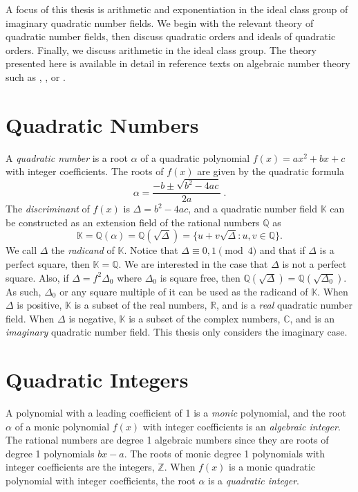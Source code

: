 \documentclass{ucalgthes1}
\theoremstyle{definition}
\newcommand{\CC}{\mathbb{C}}
\newcommand{\RR}{\mathbb{R}}
\newcommand{\KK}{\mathbb{K}}
\newcommand{\ZZ}{\mathbb{Z}}
\newcommand{\QQ}{\mathbb{Q}}
\begin{document}
A focus of this thesis is arithmetic and exponentiation in the ideal class group of imaginary quadratic number fields.  We begin with the relevant theory of quadratic number fields, then discuss quadratic orders and ideals of quadratic orders.  Finally, we discuss arithmetic in the ideal class group.  The theory presented here is available in detail in reference texts on algebraic number theory such as \cite{Cohn1980}, \cite{Hua2012}, or \cite{Ireland1990}. 



\section{Quadratic Numbers}

A \emph{quadratic number} is a root $\alpha$ of a quadratic polynomial $f(x) = ax^2 + bx + c$ with integer coefficients. The roots of $f(x)$ are given by the quadratic formula
\[
	\alpha = \frac{-b \pm \sqrt{b^2 - 4ac}}{2a} ~.
\]
The \emph{discriminant} of $f(x)$ is $\Delta = b^2 - 4ac$, and a quadratic number field $\KK$ can be constructed as an extension field of the rational numbers $\QQ$ as
\[
	\KK = \QQ(\alpha) = \QQ(\sqrt{\Delta}) = \{u + v\sqrt{\Delta} : u,v \in \QQ\}.
\]
We call $\Delta$ the \emph{radicand} of $\KK$.  Notice that $\Delta \equiv 0, 1 \pmod 4$ and that if $\Delta$ is a perfect square, then $\KK = \QQ$.  We are interested in the case that $\Delta$ is not a perfect square.  Also, if $\Delta = f^2\Delta_0$ where $\Delta_0$ is square free, then $\QQ(\sqrt\Delta) = \QQ(\sqrt{\Delta_0})$.  As such, $\Delta_0$ or any square multiple of it can be used as the radicand of $\KK$.  When $\Delta$ is positive, $\KK$ is a subset of the real numbers, $\RR$, and is a \emph{real} quadratic number field. When $\Delta$ is negative, $\KK$ is a subset of the complex numbers, $\CC$, and is an \emph{imaginary} quadratic number field.  This thesis only considers the imaginary case.


\section{Quadratic Integers}

A polynomial with a leading coefficient of 1 is a \emph{monic} polynomial, and the root $\alpha$ of a monic polynomial $f(x)$ with integer coefficients is an \emph{algebraic integer}. The rational numbers are degree 1 algebraic numbers since they are roots of degree 1 polynomials $bx-a$.  The roots of monic degree 1 polynomials with integer coefficients are the integers, $\ZZ$.  When $f(x)$ is a monic quadratic polynomial with integer coefficients, the root $\alpha$ is a \emph{quadratic integer}.
\end{document}
